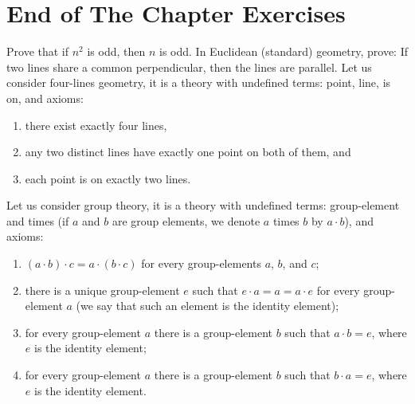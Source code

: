\section*{End of The Chapter Exercises}
\begin{exercises}
  \exerciseitem Prove that if $n^2$ is odd, then $n$ is odd.
  \exerciseitem  In Euclidean (standard) geometry, prove: If two lines share a
    common perpendicular, then the lines are parallel.
  \exerciseitem Let us consider four-lines geometry, it is a theory with
    undefined terms: point, line, is on, and axioms:
    \begin{enumerate}
        \item there exist exactly four lines,
        \item any two distinct lines have exactly one point on both of them, and
        \item each point is on exactly two lines.
    \end{enumerate}
  \exerciseitem
    Let us consider group theory, it is a theory with undefined
    terms: group-element and times (if $a$ and $b$ are group elements, we denote $a$ times $b$ by $a \cdot b$), and axioms:
    \begin{enumerate}
      \item $(a \cdot b) \cdot c = a \cdot (b \cdot c)$
        for every group-elements $a$, $b$, and $c$;
      \item there is a unique group-element $e$ such that
        $e \cdot a = a = a \cdot e$ for every group-element $a$ (we say that such
        an element is the identity element);
      \item for every group-element $a$ there is a group-element $b$
        such that $a \cdot b = e$, where $e$ is the identity element;
      \item for every group-element $a$ there is a group-element $b$
        such that $b \cdot a = e$, where $e$ is the identity element.
    \end{enumerate}


\end{exercises}
